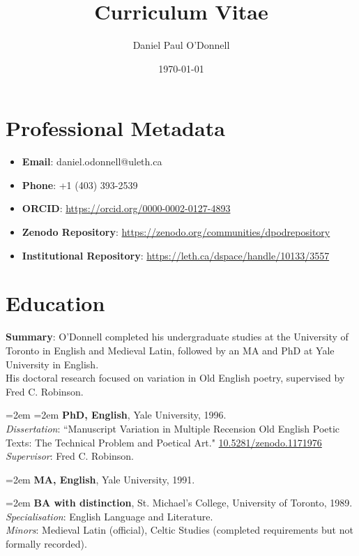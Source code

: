 \documentclass[12pt]{article}
\title{Curriculum Vitae}
\author{Daniel Paul O'Donnell}
\date{\today}
\begin{document}
\maketitle


\section*{Professional Metadata}
\begin{itemize}
  \item \textbf{Email}: daniel.odonnell@uleth.ca
  \item \textbf{Phone}: +1 (403) 393-2539
  \item \textbf{ORCID}: \url{https://orcid.org/0000-0002-0127-4893}
  \item \textbf{Zenodo Repository}: \url{https://zenodo.org/communities/dpodrepository}
  \item \textbf{Institutional Repository}: \url{https://leth.ca/dspace/handle/10133/3557}
\end{itemize}

\section*{Education}

\textbf{Summary}: O'Donnell completed his undergraduate studies at the University of Toronto in English and Medieval Latin, followed by an MA and PhD at Yale University in English.\\ His doctoral research focused on variation in Old English poetry, supervised by Fred C. Robinson.

{\leftskip=2em
\hangindent=2em
\noindent
\textbf{PhD, English}, Yale University, 1996.\\ \textit{Dissertation}: “Manuscript Variation in Multiple Recension Old English Poetic Texts: The Technical Problem and Poetical Art." \href{https://doi.org/10.5281/zenodo.1171976}{10.5281/zenodo.1171976} \\ \textit{Supervisor}: Fred C. Robinson.

\vspace{0.5em}
\hangindent=2em
\noindent
\textbf{MA, English}, Yale University, 1991.

\vspace{0.5em}
\hangindent=2em
\noindent
\textbf{BA with distinction}, St. Michael’s College, University of Toronto, 1989. \\ \textit{Specialisation}: English Language and Literature. \\ \textit{Minors}: Medieval Latin (official), Celtic Studies (completed requirements but not formally recorded).

}
\end{document}
